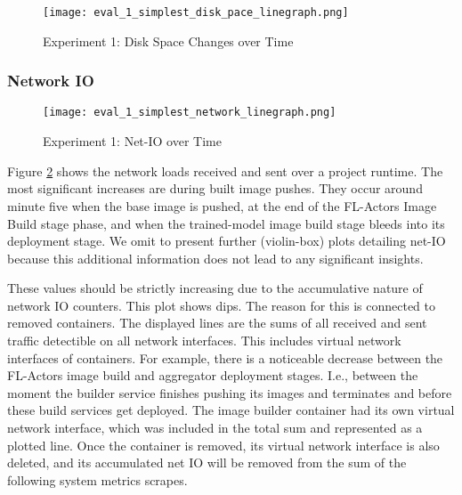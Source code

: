 \begin{figure}[h]
    \begin{adjustwidth}{-0.2\paperwidth}{-0.2\paperwidth}
        \centering
        \texttt{[image: eval\_1\_simplest\_disk\_pace\_linegraph.png]}
        \caption{Experiment 1: Disk Space Changes over Time}
        \label{fig:eval_1_simplest_disk_space}
    \end{adjustwidth}
\end{figure}

\subsubsection{Network IO}

\begin{figure}[h]
    \begin{adjustwidth}{-0.2\paperwidth}{-0.2\paperwidth}
        \centering
        \texttt{[image: eval\_1\_simplest\_network\_linegraph.png]}
        \caption{Experiment 1: Net-IO over Time}
        \label{fig:eval_1_simplest_net_io}
    \end{adjustwidth}
\end{figure}

Figure \ref{fig:eval_1_simplest_net_io} shows the network loads received and sent over a project runtime.
The most significant increases are during built image pushes.
They occur around minute five when the base image is pushed, at the end of the FL-Actors Image Build stage phase, and when the trained-model image build stage bleeds into its deployment stage.
We omit to present further (violin-box) plots detailing net-IO because this additional information does not lead to any significant insights.

These values should be strictly increasing due to the accumulative nature of network IO counters.
This plot shows dips.
The reason for this is connected to removed containers.
The displayed lines are the sums of all received and sent traffic detectible on all network interfaces.
This includes virtual network interfaces of containers.
For example, there is a noticeable decrease between the FL-Actors image build and aggregator deployment stages.
I.e., between the moment the builder service finishes pushing its images and terminates and before these build services get deployed.
The image builder container had its own virtual network interface, which was included in the total sum and represented as a plotted line.
Once the container is removed, its virtual network interface is also deleted, and its accumulated net IO will be removed from the sum of the following system metrics scrapes.

